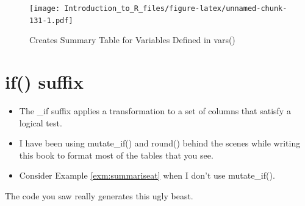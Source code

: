 \documentclass[]{book}
\newenvironment{Shaded}{\begin{snugshade}}{\end{snugshade}}
\newcommand{\DataTypeTok}[1]{\textcolor[rgb]{0.13,0.29,0.53}{#1}}
\newcommand{\KeywordTok}[1]{\textcolor[rgb]{0.13,0.29,0.53}{\textbf{#1}}}
\newcommand{\NormalTok}[1]{#1}
\newcommand{\OperatorTok}[1]{\textcolor[rgb]{0.81,0.36,0.00}{\textbf{#1}}}
\newcommand{\OtherTok}[1]{\textcolor[rgb]{0.56,0.35,0.01}{#1}}
\newcommand{\StringTok}[1]{\textcolor[rgb]{0.31,0.60,0.02}{#1}}
\providecommand{\tightlist}{%
  \setlength{\itemsep}{0pt}\setlength{\parskip}{0pt}}
\theoremstyle{definition}
\theoremstyle{definition}
\theoremstyle{definition}
\theoremstyle{remark}
\let\BeginKnitrBlock\begin \let\EndKnitrBlock\end
\begin{document}
\begin{Shaded}
\end{Shaded}

\begin{figure}
\centering
\texttt{[image: Introduction\_to\_R\_files/figure-latex/unnamed-chunk-131-1.pdf]}
\caption{\label{fig:unnamed-chunk-131}Creates Summary Table for Variables Defined in vars()}
\end{figure}

\hypertarget{if-suffix}{%
\section{if() suffix}\label{if-suffix}}

\begin{itemize}
\tightlist
\item
  The \_if suffix applies a transformation to a set of columns that satisfy a logical test.
\item
  I have been using mutate\_if() and round() behind the scenes while writing this book to format most of the tables that you see.
\item
  Consider Example \ref{exm:summariseat} when I don't use mutate\_if().
\end{itemize}

\BeginKnitrBlock{example}
\protect\hypertarget{exm:summariseat2}{}{\label{exm:summariseat2} }The code you saw really generates this ugly beast.
\EndKnitrBlock{example}

\begin{Shaded}
\end{Shaded}
\end{document}
